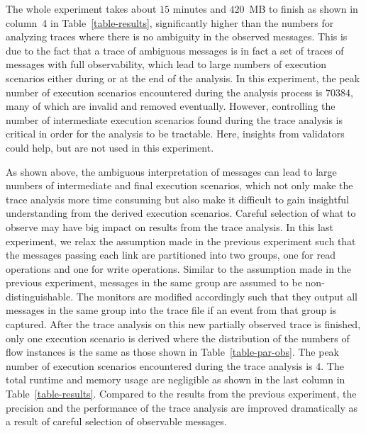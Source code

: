 \documentclass[12pt,frontmatter,copyright,thesis]{usfmanus}
\begin{document}
The whole experiment takes about $15$ minutes and $420$~MB to finish as shown in column~4
in Table~\ref{table-results}, significantly higher than the numbers for analyzing traces where there is no ambiguity in the observed messages.
This is due to the fact that a trace of ambiguous messages is in fact a set of traces of messages with full observability, which lead to large numbers of execution scenarios either during or at the end of the analysis.  In this experiment, the peak number of execution scenarios encountered during the analysis process is $70384$, many of which are invalid and removed eventually.  However, controlling the number of intermediate execution scenarios found during the trace analysis is critical in order for the analysis to be tractable.  Here, insights from validators could help, but are not used in this experiment.   

As shown above, the ambiguous interpretation of messages can lead to large numbers of intermediate and final execution scenarios, which not only make the trace analysis more time consuming but also make it difficult to gain insightful understanding from the derived execution scenarios.  Careful selection of what to observe may have big impact on results from the trace analysis.  In this last experiment, we relax the assumption made in the previous experiment such that the messages passing each link are partitioned into two groups, one for read operations and one for write operations.  Similar to the assumption made in the previous experiment, messages in the same group are assumed to be non-distinguishable.  The monitors are modified accordingly such that they output all messages in the same group into the trace file if an event from that group is captured.  After the trace analysis on this new partially observed trace is finished, only one execution scenario is derived where the distribution of the numbers of flow instances is the same as those shown in Table~\ref{table-par-obs}.  The peak number of execution scenarios encountered during the trace analysis is $4$.  The total runtime and memory usage are negligible as shown in the last column in Table~\ref{table-results}.  Compared to the results from the previous experiment, the precision and the performance of the trace analysis are improved dramatically as a result of careful selection of observable messages. 
\end{document}
